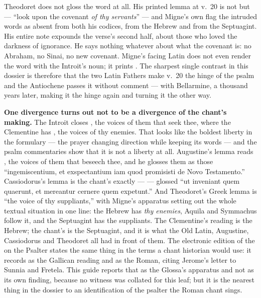 \begin{witnessnote}
Theodoret does not gloss the word at all. His printed lemma at v.~20 is not
 but  --- ``look upon the covenant \emph{of thy servants}''
--- and Migne's own  flag the intruded words as absent
from both his codices, from the Hebrew and from the Septuagint. His entire note
expounds the verse's second half, about those who loved the darkness of
ignorance. He says nothing whatever about what the covenant is: no Abraham, no
Sinai, no new covenant. Migne's facing Latin does not even render the word with
the Introit's noun; it prints . The sharpest single contrast in
this dossier is therefore that the two Latin Fathers make v.~20 the hinge of
the psalm and the Antiochene passes it without comment --- with Bellarmine, a
thousand years later, making it the hinge again and turning it the other way.
\end{witnessnote}

\textbf{One divergence turns out not to be a divergence of the chant's making.}
The Introit closes , the voices
of them that seek thee, where the Clementine has , the voices of thy enemies. That looks like the boldest liberty in the
formulary --- the prayer changing direction while keeping its words --- and the
psalm commentaries show that it is not a liberty at all. Augustine's lemma
reads , the voices of them that
beseech thee, and he glosses them as those ``ingemiscentium, et exspectantium
iam quod promisisti de Novo Testamento.'' Cassiodorus's lemma is the chant's
exactly ---  --- glossed ``ut
inveniant quem quaerunt, et mereantur cernere quem expetunt.'' And Theodoret's
Greek lemma is ``the voice of thy suppliants,'' with Migne's apparatus setting
out the whole textual situation in one line: the Hebrew has \textit{thy
enemies}, Aquila and Symmachus follow it, and the Septuagint has the
suppliants. The Clementine's reading is the Hebrew; the chant's is the
Septuagint, and it is what the Old Latin, Augustine, Cassiodorus and Theodoret
all had in front of them. The electronic edition of the  on the Psalter states the same thing in the terms a chant historian
would use: it records  as the Gallican reading and
 as the Roman, citing Jerome's letter to Sunnia and Fretela.
This guide reports that as the Glossa's apparatus and not as its own finding,
because no  witness was collated for this leaf; but it
is the nearest thing in the dossier to an identification of the psalter the
Roman chant sings.

